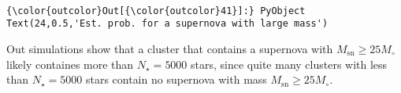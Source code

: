 \documentclass[11pt]{article}
\begin{document}
    \begin{center}
    \end{center}
    { \hspace*{\fill} \\}
    
\begin{Verbatim}[commandchars=\\\{\}]
{\color{outcolor}Out[{\color{outcolor}41}]:} PyObject Text(24,0.5,'Est. prob. for a supernova with large mass')
\end{Verbatim}
            
    Out simulations show that a cluster that contains a supernova with
\(M_{\text{sn}} \geq 25 M_{\circ}\) likely containes more than
\(N_{\star} = 5000\) stars, since quite many clusters with less than
\(N_{\star} = 5000\) stars contain no supernova with mass
\(M_{\text{sn}} \geq 25 M_{\circ}\).


    
    
    
    
\end{document}
